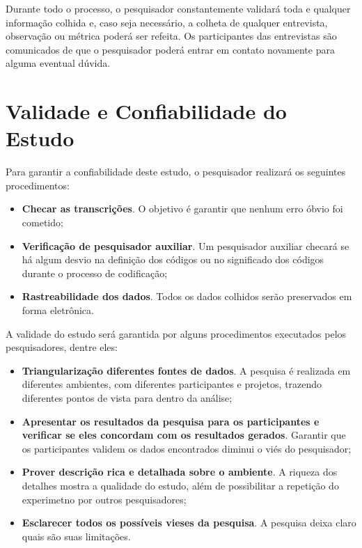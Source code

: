 Durante todo o processo, o pesquisador constantemente validará toda e qualquer
informação colhida e, caso seja necessário, a colheta de qualquer entrevista,
observação ou métrica poderá ser refeita. Os participantes das entrevistas
são comunicados de que o pesquisador poderá entrar em contato
novamente para alguma eventual dúvida.

\section{Validade e Confiabilidade do Estudo}
\label{sec:planejamento-validacao}

Para garantir a confiabilidade deste estudo, o pesquisador realizará os
seguintes procedimentos:

\begin{itemize}
	\item \textbf{Checar as transcrições}. O objetivo é garantir que nenhum erro
	óbvio foi cometido;

	\item \textbf{Verificação de pesquisador auxiliar}. Um pesquisador auxiliar
	checará se há algum desvio na definição dos códigos ou no significado dos códigos 
	durante o processo de codificação;
	
	\item \textbf{Rastreabilidade dos dados}. Todos os dados colhidos serão
	preservados em forma eletrônica.

\end{itemize}

A validade do estudo será garantida por alguns procedimentos executados pelos
pesquisadores, dentre eles:

\begin{itemize}
	\item \textbf{Triangularização diferentes fontes de dados}. A pesquisa é
	realizada em diferentes ambientes, com diferentes participantes e projetos,
	trazendo diferentes pontos de vista para dentro da análise;

	\item \textbf{Apresentar os resultados da pesquisa para os participantes e
	verificar se eles concordam com os resultados gerados}. Garantir que os
	participantes validem os dados encontrados diminui o viés do pesquisador;

	\item \textbf{Prover descrição rica e detalhada sobre o ambiente}. A riqueza
	dos detalhes mostra a qualidade do estudo, além de possibilitar a repetição do
	experimetno por outros pesquisadores;

	\item \textbf{Esclarecer todos os possíveis vieses da pesquisa}. A pesquisa
	deixa claro quais são suas limitações.

\end{itemize}

